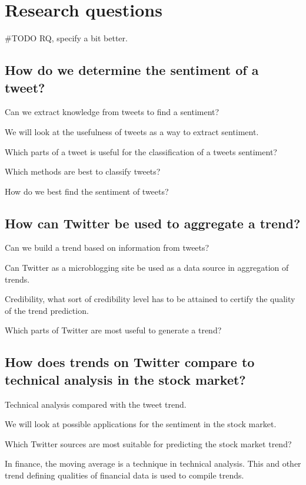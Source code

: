 \section{Research questions}\label{introduction:research_questions}
#TODO RQ, specify a bit better.\\ 

\subsection{How do we determine the sentiment of a
tweet?}\label{introduction:rq1}
Can we extract knowledge from tweets to find a sentiment?
	
We will look at the usefulness of tweets as a way to extract sentiment. 

Which parts of a tweet is useful for the classification of a tweets sentiment?

Which methods are best to classify tweets? 

How do we best find the sentiment of tweets?

\subsection{How can Twitter be used to aggregate a
trend?}\label{introduction:rq2}
Can we build a trend based on information from tweets? 
 
Can Twitter as a microblogging site be used as a data source in aggregation of trends.

Credibility, what sort of credibility level has to be attained to certify the
quality of the trend prediction. 

Which parts of Twitter are most useful to generate a trend?

\subsection{How does trends on Twitter compare to technical analysis in the
stock market?}\label{introduction:rq3}
Technical analysis compared with the tweet trend.

We will look at possible applications for the sentiment in the stock market.

Which Twitter sources are most suitable for predicting the stock market
trend?

In finance, the moving average is a technique in technical analysis. This and
other trend defining qualities of financial data is used to compile trends. 

